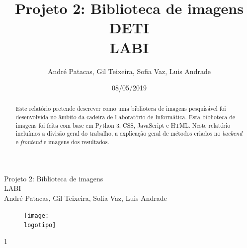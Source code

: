 \documentclass{report}
\begin{document}
%
\def\titulo{Projeto 2: Biblioteca de imagens}
\def\data{08/05/2019}
\def\autores{André Patacas, Gil Teixeira, Sofia Vaz, Luis Andrade}
\def\autorescontactos{(93357) andrepatacas@ua.pt, (88194) gilteixeira@ua.pt, (92968) sofiateixeiravaz@ua.pt, (93159) luisnunoferreirap.a@ua.pt}
\def\versao{1}
\def\departamento{DETI}
\def\empresa{LABI}
\def\logotipo{ua.pdf}

%
%
\begin{titlepage}

\begin{center}
\centering
%
\vspace*{50mm}
%
{\Huge \titulo}\\ 
%
\vspace{10mm}
%
{\Large \empresa}\\
%
\vspace{10mm}
%
{\large \autores}\\ 
%
\vspace{30mm}
%
\begin{figure}[h]
\centering
\texttt{[image: \\logotipo]}
\end{figure}
%
\vspace{30mm}
\end{center}
%
\begin{flushright}
\versao
\end{flushright}
\end{titlepage}

\title{%
{\Huge\textbf{\titulo}}\\
{\Large \departamento\\ \empresa}
}
%
\author{%
    \autores 
}
%
\date{\data}
%
\maketitle



\begin{abstract}
Este relatório pretende descrever como uma biblioteca de imagens pesquisável foi desenvolvida no âmbito da cadeira de Laboratório de Informática. Esta biblioteca de imagens foi feita com base em Python 3, \ac{CSS}, JavaScript e \ac{HTML}. Neste relatório incluímos a divisão geral do trabalho, a explicação geral de métodos criados no \textit{backend} e \textit{frontend} e imagens dos resultados. 
\end{abstract}
\end{document}
